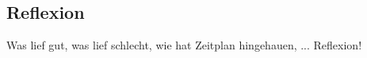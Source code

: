 \documentclass[main.tex]{subfiles} %
\begin{document}

\subsection{Reflexion}

Was lief gut, was lief schlecht, wie hat Zeitplan hingehauen, ... Reflexion!
\end{document}
